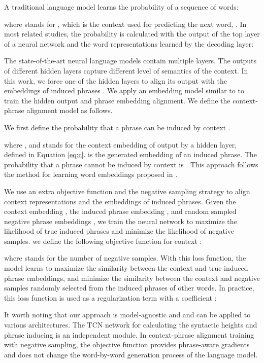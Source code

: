 \documentclass[11pt,a4paper]{article}
\begin{document}
A traditional language model learns the probability of a sequence of words:

where  stands for , which is the context used for predicting the next word, . In most related studies, the probability  is calculated with the output of the top layer of a neural network  and the word representations  learned by the decoding layer:


The state-of-the-art neural language models contain multiple layers. The outputs of different hidden layers capture different level of semantics of the context. In this work, we force one of the hidden layers to align its output with the embeddings of induced phrases . We apply an embedding model similar to \citet{mikolov2013distributed} to train the hidden output and phrase embedding alignment. We define the context-phrase alignment model as follows.


We first define the probability that a phrase  can be induced by context .

where , and  stands for the context embedding of  output by a hidden layer, defined in Equation \ref{eq:c}.  is the generated embedding of an induced phrase. The probability that a phrase  cannot be induced by context  is . This approach follows the method for learning word embeddings proposed in \citet{mikolov2013distributed}.

We use an extra objective function and the negative sampling strategy to align context representations and the embeddings of induced phrases. Given the context embedding , the induced phrase embedding , and random sampled negative phrase embeddings , we train the neural network to maximize the likelihood of true induced phrases and minimize the likelihood of negative samples. we define the following objective function for context :

where  stands for the number of negative samples. With this loss function, the model learns to maximize the similarity between the context and true induced phrase embeddings, and minimize the similarity between the context and negative samples randomly selected from the induced phrases of other words. In practice, this loss function is used as a regularization term with a coefficient :



It worth noting that our approach is model-agnostic and and can be applied to various architectures. The TCN network for calculating the syntactic heights and phrase inducing is an independent module. In context-phrase alignment training with negative sampling, the objective function provides phrase-aware gradients and does not change the word-by-word generation process of the language model. 
\end{document}
